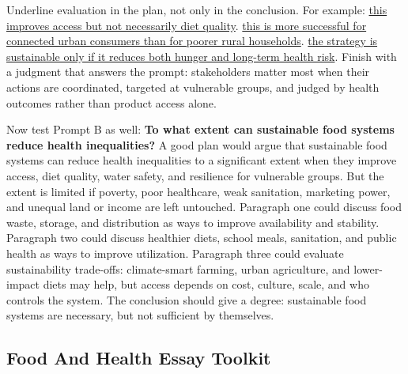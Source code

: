 \documentclass[11pt,a4paper]{article}
\newcommand{\exam}[1]{\textcolor{AccentTeal}{\textbf{#1}}}
\begin{document}
Underline evaluation in the plan, not only in the conclusion. For example:
\uline{this improves access but not necessarily diet quality}. \uline{this is
more successful for connected urban consumers than for poorer rural
households}. \uline{the strategy is sustainable only if it reduces both hunger
and long-term health risk}. Finish with a judgment that answers the prompt:
stakeholders matter most when their actions are coordinated, targeted at
vulnerable groups, and judged by health outcomes rather than product access
alone.

Now test Prompt B as well: \exam{To what extent can sustainable food systems
reduce health inequalities?} A good plan would argue that sustainable food
systems can reduce health inequalities to a significant extent when they
improve access, diet quality, water safety, and resilience for vulnerable
groups. But the extent is limited if poverty, poor healthcare, weak sanitation,
marketing power, and unequal land or income are left untouched. Paragraph one
could discuss food waste, storage, and distribution as ways to improve
availability and stability. Paragraph two could discuss healthier diets, school
meals, sanitation, and public health as ways to improve utilization. Paragraph
three could evaluate sustainability trade-offs: climate-smart farming, urban
agriculture, and lower-impact diets may help, but access depends on cost,
culture, scale, and who controls the system. The conclusion should give a
degree: sustainable food systems are necessary, but not sufficient by
themselves.

\subsection{Food And Health Essay Toolkit}
\end{document}
